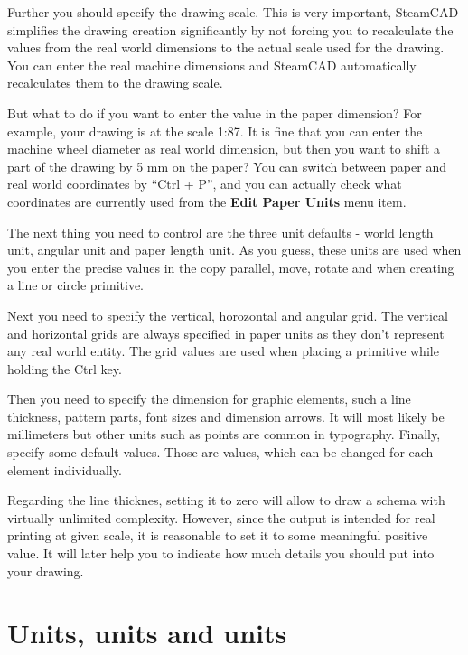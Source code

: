 Further you should specify the drawing scale. This is very important, SteamCAD
simplifies the drawing creation significantly by not forcing you to recalculate
the values from the real world dimensions to the actual scale used for the drawing.
You can enter the real machine dimensions and SteamCAD automatically recalculates
them to the drawing scale.

But what to do if you want to enter the value in the paper dimension? For example,
your drawing is at the scale 1:87. It is fine that you can enter the machine
wheel diameter as real world dimension, but then you want to shift a part of the
drawing by 5 mm on the paper? You can switch between paper and real world
coordinates by ``Ctrl + P'', and you can actually check what coordinates are
currently used from the \textbf{Edit \lar{} Paper Units} menu item.

The next thing you need to control are the three unit defaults - world length
unit, angular unit and paper length unit. As you guess, these units are used
when you enter the precise values in the copy parallel, move, rotate and when
creating a line or circle primitive.

Next you need to specify the vertical, horozontal and angular grid. The vertical
and horizontal grids are always specified in paper units as they don't represent
any real world entity. The grid values are used when placing a primitive while
holding the Ctrl key.

Then you need to specify the dimension for graphic elements, such a line thickness,
pattern parts, font sizes and dimension arrows. It will most likely be millimeters
but other units such as points are common in typography. Finally, specify some
default values. Those are values, which can be changed for each element individually.

Regarding the line thicknes, setting it to zero will allow to draw a schema
with virtually unlimited complexity. However, since the output is intended for
real printing at given scale, it is reasonable to set it to some meaningful positive
value. It will later help you to indicate how much details you should put into
your drawing.


\section{Units, units and units}\label{sec:units}

